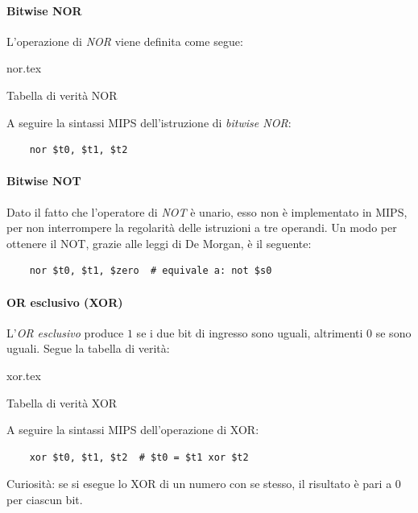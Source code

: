 \documentclass[class=book, crop=false]{standalone}
\begin{document}
\paragraph{Bitwise NOR}
L'operazione di \emph{NOR} viene definita come segue:
\begin{table}[H]
	\centering
	{nor.tex}
	\caption{Tabella di verità NOR}
\end{table}

A seguire la sintassi MIPS dell'istruzione di \emph{bitwise NOR}:
\begin{verbatim}
	nor $t0, $t1, $t2
\end{verbatim}

\paragraph{Bitwise NOT}
Dato il fatto che l'operatore di \emph{NOT} è unario, esso non è implementato in MIPS, per non interrompere la regolarità delle istruzioni a tre operandi. Un modo per ottenere il NOT, grazie alle leggi di De Morgan, è il seguente:
\begin{verbatim}
	nor $t0, $t1, $zero  # equivale a: not $s0
\end{verbatim}

\paragraph{OR esclusivo (XOR)}
L'\emph{OR esclusivo} produce \(1\) se i due bit di ingresso sono uguali, altrimenti \(0\) se sono uguali. Segue la tabella di verità:
\begin{table}[H]
	\centering
	{xor.tex}
	\caption{Tabella di verità XOR}
\end{table}

A seguire la sintassi MIPS dell'operazione di XOR:
\begin{verbatim}
	xor $t0, $t1, $t2  # $t0 = $t1 xor $t2
\end{verbatim}

Curiosità: se si esegue lo XOR di un numero con se stesso, il risultato è pari a \(0\) per ciascun bit.
\end{document}
